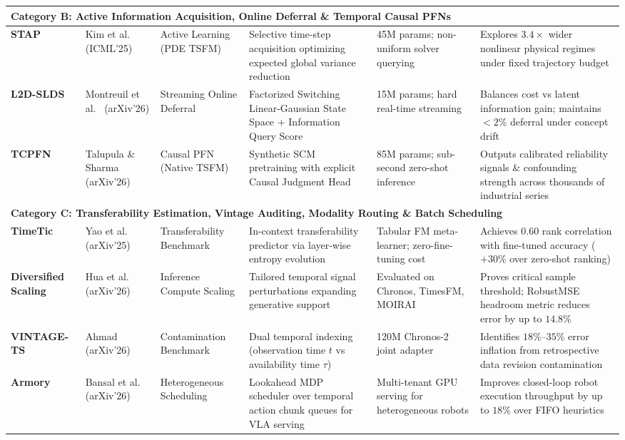 \begin{table}[t]
{\begin{tabular}{llllll}
\midrule
\multicolumn{6}{l}{\textbf{Category B: Active Information Acquisition, Online Deferral \& Temporal Causal PFNs}} \\
\midrule
\textbf{STAP} & Kim et al.~\cite{kim2025stap} (ICML'25) & Active Learning (PDE TSFM) & Selective time-step acquisition optimizing expected global variance reduction & 45M params; non-uniform solver querying & Explores $3.4\times$ wider nonlinear physical regimes under fixed trajectory budget \\
\midrule
\textbf{L2D-SLDS} & Montreuil et al.~\cite{montreuil2026l2dslds} (arXiv'26) & Streaming Online Deferral & Factorized Switching Linear-Gaussian State Space + Information Query Score & 15M params; hard real-time streaming & Balances cost vs latent information gain; maintains $<2\%$ deferral under concept drift \\
\midrule
\textbf{TCPFN} & Talupula \& Sharma~\cite{talupula2026tcpfn} (arXiv'26) & Causal PFN (Native TSFM) & Synthetic SCM pretraining with explicit Causal Judgment Head & 85M params; sub-second zero-shot inference & Outputs calibrated reliability signals \& confounding strength across thousands of industrial series \\
\midrule
\multicolumn{6}{l}{\textbf{Category C: Transferability Estimation, Vintage Auditing, Modality Routing \& Batch Scheduling}} \\
\midrule
\textbf{TimeTic} & Yao et al.~\cite{yao2025timetic} (arXiv'25) & Transferability Benchmark & In-context transferability predictor via layer-wise entropy evolution & Tabular FM meta-learner; zero-fine-tuning cost & Achieves 0.60 rank correlation with fine-tuned accuracy ($+30\%$ over zero-shot ranking) \\
\midrule
\textbf{Diversified Scaling} & Hua et al.~\cite{hua2026diversified} (arXiv'26) & Inference Compute Scaling & Tailored temporal signal perturbations expanding generative support & Evaluated on Chronos, TimesFM, MOIRAI & Proves critical sample threshold; RobustMSE headroom metric reduces error by up to $14.8\%$ \\
\midrule
\textbf{VINTAGE-TS} & Ahmad~\cite{ahmad2026vintagets} (arXiv'26) & Contamination Benchmark & Dual temporal indexing (observation time $t$ vs availability time $\tau$) & 120M Chronos-2 joint adapter & Identifies $18\%\text{--}35\%$ error inflation from retrospective data revision contamination \\
\midrule
\textbf{Armory} & Bansal et al.~\cite{bansal2026armory} (arXiv'26) & Heterogeneous Scheduling & Lookahead MDP scheduler over temporal action chunk queues for VLA serving & Multi-tenant GPU serving for heterogeneous robots & Improves closed-loop robot execution throughput by up to $18\%$ over FIFO heuristics \\

\end{tabular}}
\end{table}
